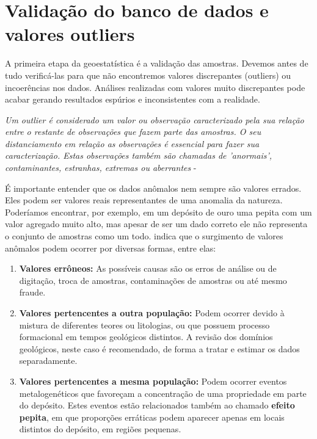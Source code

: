 \section{Validação do banco de dados e valores outliers}

A primeira etapa da geoestatística é a validação das amostras. Devemos antes de tudo verificá-las para que não encontremos valores discrepantes (outliers) ou incoerências nos dados. Análises realizadas com valores muito discrepantes pode acabar gerando resultados espúrios e inconsistentes com a realidade. 

\begin{definition}[Outlier]
	\textit{Um outlier é considerado um valor ou observação caracterizado pela sua relação entre o restante de observações que fazem parte das amostras. O seu distanciamento em relação as observações é essencial para fazer sua caracterização. Estas observações também são chamadas de 'anormais', contaminantes, estranhas, extremas ou aberrantes} - \cite{figueira1998identificaccao}
\end{definition}

 É importante entender que os dados anômalos nem sempre são valores errados. Eles podem ser valores reais representantes de uma anomalia da natureza. Poderíamos encontrar, por exemplo, em um depósito de ouro uma pepita com um valor agregado muito alto, mas apesar de ser um dado correto ele não representa o conjunto de amostras como um todo. \citet{machado2012alternativa} indica que o surgimento de valores anômalos podem ocorrer por diversas formas, entre elas: 

\begin{enumerate}
	\item \textbf{Valores errôneos:} As possíveis causas são os erros de análise ou de digitação, troca de amostras, contaminações de amostras ou até mesmo fraude. 
	\item \textbf{Valores pertencentes a outra população:} Podem ocorrer devido à mistura de diferentes teores ou litologias, ou que possuem processo formacional em tempos geológicos distintos. A revisão dos domínios geológicos, neste caso é recomendado, de forma a tratar e estimar os dados separadamente. 
	\item \textbf{Valores pertencentes a mesma população:} Podem ocorrer eventos metalogenéticos que favoreçam a concentração de uma propriedade em parte do depósito. Estes eventos estão relacionados também ao chamado \textbf{efeito pepita}, em que proporções erráticas podem aparecer apenas em locais distintos do depósito, em regiões pequenas. 
\end{enumerate}

